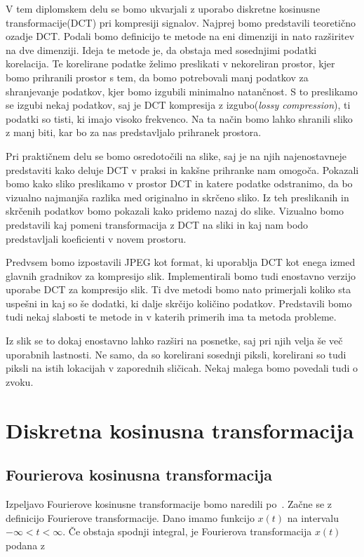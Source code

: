 \documentclass[a4paper,12pt,openright]{book}
\begin{document}
V tem diplomskem delu se bomo ukvarjali z uporabo diskretne kosinusne transformacije(DCT) pri kompresiji signalov. Najprej bomo predstavili teoretično ozadje DCT. Podali bomo definicijo te metode na eni dimenziji in nato razširitev na dve dimenziji. Ideja te metode je, da obstaja med sosednjimi podatki korelacija. Te korelirane podatke želimo preslikati v nekoreliran prostor, kjer bomo prihranili prostor s tem, da bomo potrebovali manj podatkov za shranjevanje podatkov, kjer bomo izgubili minimalno natančnost. S to preslikamo se izgubi nekaj podatkov, saj je DCT kompresija z izgubo(\textit{lossy compression}), ti podatki so tisti, ki imajo visoko frekvenco. Na ta način bomo lahko shranili sliko z manj biti, kar bo za nas predstavljalo prihranek prostora.\par 
Pri praktičnem delu se bomo osredotočili na slike, saj je na njih najenostavneje predstaviti kako deluje DCT v praksi in kakšne prihranke nam omogoča. Pokazali bomo kako sliko preslikamo v prostor DCT in katere podatke odstranimo, da bo vizualno najmanjša razlika med originalno in skrčeno sliko. Iz teh preslikanih in skrčenih podatkov bomo pokazali kako pridemo nazaj do slike. Vizualno bomo predstavili kaj pomeni transformacija z DCT na sliki in kaj nam bodo predstavljali koeficienti v novem prostoru. \par
Predvsem bomo izpostavili JPEG kot format, ki uporablja DCT kot enega izmed glavnih gradnikov za kompresijo slik. Implementirali bomo tudi enostavno verzijo uporabe DCT za kompresijo slik. Ti dve metodi bomo nato primerjali koliko sta uspešni in kaj so še dodatki, ki dalje skrčijo količino podatkov. Predstavili bomo tudi nekaj slabosti te metode in v katerih primerih ima ta metoda probleme. \par
Iz slik se to dokaj enostavno lahko razširi na posnetke, saj pri njih velja še več uporabnih lastnosti. Ne samo, da so korelirani sosednji piksli, korelirani so tudi piksli na istih lokacijah v zaporednih sličicah. Nekaj malega bomo povedali tudi o zvoku.


\chapter{Diskretna kosinusna transformacija} 
\label{DCT}

\section{Fourierova kosinusna transformacija}%
Izpeljavo Fourierove kosinusne transformacije bomo naredili po~\cite{britanak2010discrete}. Začne se z definicijo Fourierove transformacije. Dano imamo funkcijo $x(t)$ na intervalu $-\infty < t < \infty$. Če obstaja spodnji integral, je Fourierova transformacija $x(t)$ podana z
\end{document}
